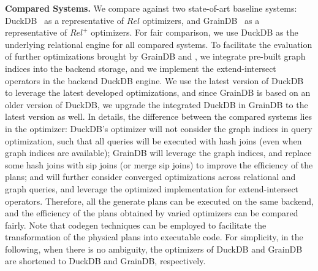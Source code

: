 \noindent\textbf{Compared Systems. }
We compare \name against two state-of-art baseline systems: DuckDB~\cite{duckdb} as a representative of $Rel$ optimizers, and GrainDB~\cite{graindb} as a representative of $Rel^+$ optimizers.
For fair comparison, we use DuckDB as the underlying relational engine for all compared systems.
To facilitate the evaluation of further optimizations brought by GrainDB and \name, 
we integrate pre-built graph indices into the backend storage, and we implement the extend-intersect operators in the backend DuckDB engine.
We use the latest version of DuckDB to leverage the latest developed optimizations, and since GrainDB is based on an older version of DuckDB, we upgrade the integrated DuckDB in GrainDB to the latest version as well.
In details, the difference between the compared systems lies in the optimizer: DuckDB's optimizer will not consider the graph indices in query optimization, such that all queries will be executed with hash joins (even when graph indices are available);
GrainDB will leverage the graph indices, and replace some hash joins with sip joins (or merge sip joins) to improve the efficiency of the plans;
and \name will further consider converged optimizations across relational and graph queries, and leverage the optimized implementation for extend-intersect operators.
Therefore, all the generate plans can be executed on the same backend, and the efficiency of the plans obtained by varied optimizers can be compared fairly.
Note that codegen techniques can be employed to facilitate the transformation of the physical plans into executable code.
For simplicity, in the following, when there is no ambiguity, the optimizers of DuckDB and GrainDB are shortened to DuckDB and GrainDB, respectively.

